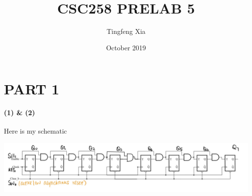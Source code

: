 \documentclass{article}
\title{CSC258 PRELAB 5}
\author{Tingfeng Xia}
\date{October 2019}
\begin{document}
\maketitle
\section*{PART 1}
\paragraph{(1) \& (2)} Here is my schematic
\begin{center}
	\includegraphics[scale=0.25]{q1_scheme.jpg}
\end{center}
\end{document}
